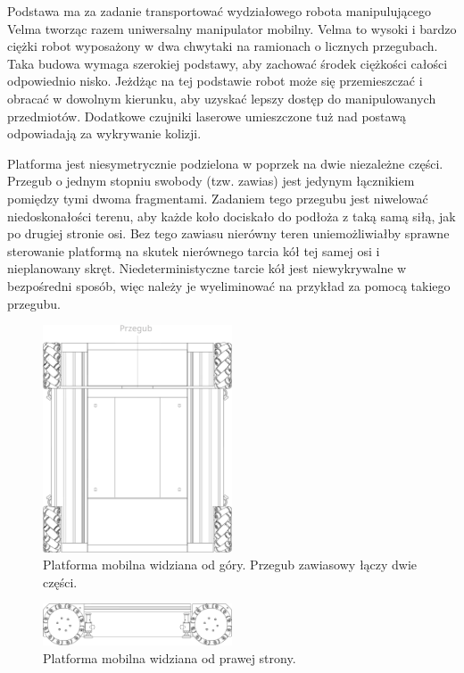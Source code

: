 Podstawa ma za zadanie transportować wydziałowego robota manipulującego Velma tworząc razem uniwersalny manipulator mobilny.
Velma to wysoki i bardzo ciężki robot wyposażony w dwa chwytaki na ramionach o licznych przegubach.
Taka budowa wymaga szerokiej podstawy, aby zachować środek ciężkości całości odpowiednio nisko.
Jeżdżąc na tej podstawie robot może się przemieszczać i obracać w dowolnym kierunku, aby uzyskać lepszy dostęp do manipulowanych przedmiotów.
Dodatkowe czujniki laserowe umieszczone tuż nad postawą odpowiadają za wykrywanie kolizji.

Platforma jest niesymetrycznie podzielona w poprzek na dwie niezależne części.
Przegub o jednym stopniu swobody (tzw. zawias) jest jedynym łącznikiem pomiędzy tymi dwoma fragmentami.
Zadaniem tego przegubu jest niwelować niedoskonałości terenu, aby każde koło dociskało do podłoża z taką samą siłą, jak po drugiej stronie osi.
Bez tego zawiasu nierówny teren uniemożliwiałby sprawne sterowanie platformą na skutek nierównego tarcia kół tej samej osi i nieplanowany skręt.
Niedeterministyczne tarcie kół jest niewykrywalne w bezpośredni sposób, więc należy je wyeliminować na przykład za pomocą takiego przegubu.

\begin{figure}[H]
\centering
 \includegraphics[width=0.5\textwidth]{graphics/base_top.pdf}
\caption{Platforma mobilna widziana od góry. Przegub zawiasowy łączy dwie części.}
\end{figure} 

\begin{figure}[H]
\centering
 \includegraphics[width=0.5\textwidth]{graphics/base_side.pdf}
\caption{Platforma mobilna widziana od prawej strony.}
\end{figure} 

